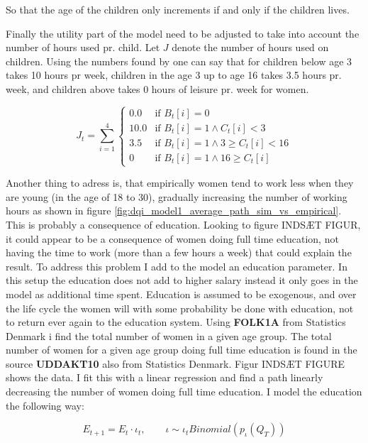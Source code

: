 So that the age of the children only increments if and only if the children lives.

Finally the utility part of the model need to be adjusted to take into account the number of hours used pr. child. Let $J$ denote the number of hours used on children. Using the numbers found by \parencite{ekert-jaffe_time_2015} one can say that for children below age 3 takes 10 hours pr week, children in the age 3 up to age 16 takes 3.5 hours pr. week, and children above takes 0 hours of leisure pr. week for women. 

\begin{equation}
    J_t = \sum_{i=1}^4 \begin{cases}
        0.0 & \text{if } B_t[i] = 0 \\
        10.0 & \text{if } B_t[i] = 1 \land C_t[i] < 3 \\
        3.5 & \text{if } B_t[i] = 1 \land 3 \geq C_t[i] < 16 \\
        0 & \text{if } B_t[i] = 1 \land  16 \geq  C_t[i] 
    \end{cases}
\end{equation}

Another thing to adress is, that empirically women tend to work less when they are young (in the age of 18 to 30), gradually increasing the number of working hours as shown in figure \ref{fig:dqi_model1_average_path_sim_vs_empirical}. This is probably a consequence of education. Looking to figure INDSÆT FIGUR, it could appear to be a consequence of women doing full time education, not having the time to work (more than a few hours a week) that could explain the result. To address this problem I add to the model an education parameter. In this setup the education does not add to higher salary instead it only goes in the model as additional time spent. Education is assumed to be exogenous, and over the life cycle the women will with some probability be done with education, not to return ever again to the education system. Using \textbf{FOLK1A} from Statistics Denmark i find the total number of women in a given age group. The total number of women for a given age group doing full time education is found in the source \textbf{UDDAKT10} also from Statistics Denmark. Figur INDSÆT FIGURE shows the data. I fit this with a linear regression and find a path linearly decreasing the number of women doing full time education. I model the education the following way:

\begin{equation}
    E_{t+1} = E_{t} \cdot \iota_t, \qquad \iota \sim \iota_t Binomial(p_{\iota}(Q_T))
\end{equation}

